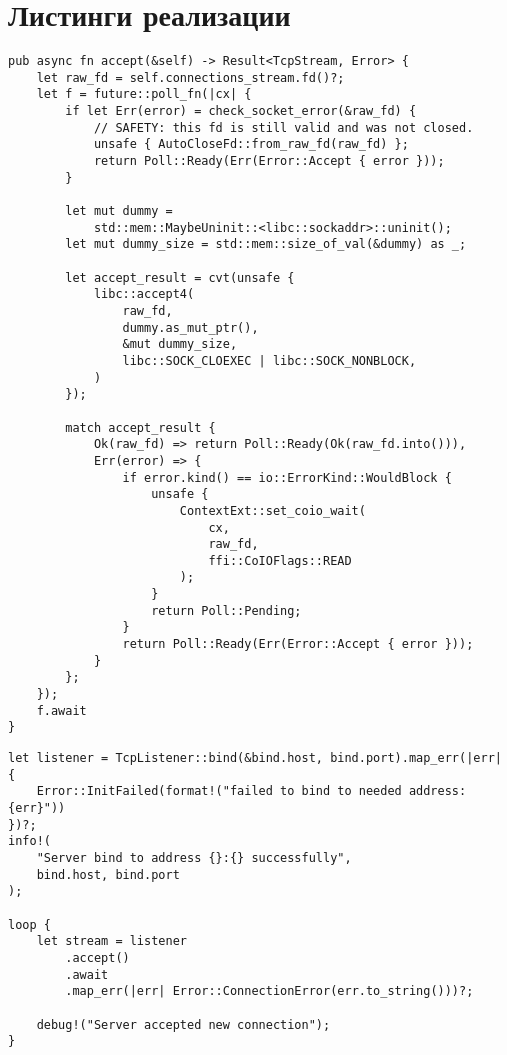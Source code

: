 \documentclass[times,numbers=noenddot]{itmo-student-thesis}
\begin{document}
\chapter{Листинги реализации}\label{sec:app:1}

\begin{lstlisting}[float=!h,caption={Реализация ключевого метода accept},label={lst1}]
pub async fn accept(&self) -> Result<TcpStream, Error> {
    let raw_fd = self.connections_stream.fd()?;
    let f = future::poll_fn(|cx| {
        if let Err(error) = check_socket_error(&raw_fd) {
            // SAFETY: this fd is still valid and was not closed.
            unsafe { AutoCloseFd::from_raw_fd(raw_fd) };
            return Poll::Ready(Err(Error::Accept { error }));
        }

        let mut dummy =
            std::mem::MaybeUninit::<libc::sockaddr>::uninit();
        let mut dummy_size = std::mem::size_of_val(&dummy) as _;

        let accept_result = cvt(unsafe {
            libc::accept4(
                raw_fd,
                dummy.as_mut_ptr(),
                &mut dummy_size,
                libc::SOCK_CLOEXEC | libc::SOCK_NONBLOCK,
            )
        });

        match accept_result {
            Ok(raw_fd) => return Poll::Ready(Ok(raw_fd.into())),
            Err(error) => {
                if error.kind() == io::ErrorKind::WouldBlock {
                    unsafe {
                        ContextExt::set_coio_wait(
                            cx,
                            raw_fd,
                            ffi::CoIOFlags::READ
                        );
                    }
                    return Poll::Pending;
                }
                return Poll::Ready(Err(Error::Accept { error }));
            }
        };
    });
    f.await
}
\end{lstlisting}

\begin{lstlisting}[float=!h,caption={Главный цикл веб-сервера},label={lst2}]
let listener = TcpListener::bind(&bind.host, bind.port).map_err(|err| {
    Error::InitFailed(format!("failed to bind to needed address: {err}"))
})?;
info!(
    "Server bind to address {}:{} successfully",
    bind.host, bind.port
);

loop {
    let stream = listener
        .accept()
        .await
        .map_err(|err| Error::ConnectionError(err.to_string()))?;

    debug!("Server accepted new connection");
}
\end{lstlisting}
\end{document}

